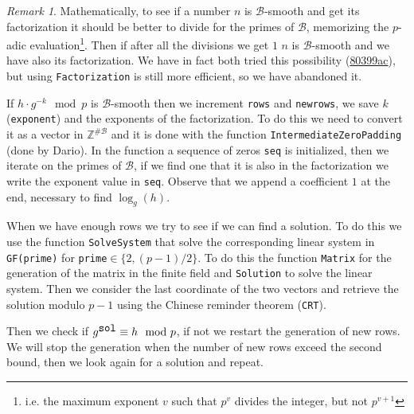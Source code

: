 \documentclass{article}
\newcommand{\ZZ}{\mathbb{Z}}
\newcommand{\BB}{\mathcal{B}}
\theoremstyle{plain}
\theoremstyle{remark}
\newtheorem{rem}{Remark}
\theoremstyle{definition}
\begin{document}
\begin{rem}
	Mathematically, to see if a number $n$ is $\mathcal{B}$-smooth and get its factorization it should be better to divide for the primes of $\BB$, memorizing the $p$-adic evaluation\footnote{i.e. the maximum exponent $v$ such that $p^v$ divides the integer, but not $p^{v+1}$}. Then if after all the divisions we get $1$ $n$ is $\BB$-smooth and we have also its factorization. 
	We have in fact both tried this possibility (\href{https://github.com/giacomoborin/project2_MAGMA/commit/80399ac928cf19e009451f174adc4138283580f2}{80399ac}), but using \texttt{Factorization} is still more efficient, so we have abandoned it. 
\end{rem}
If $h\cdot g^{-k} \mod p$ is $\BB$-smooth then we increment \texttt{rows} and \texttt{newrows}, we save $k$ (\texttt{exponent}) and the exponents of the factorization. To do this we need to convert it as a vector in $\ZZ^{\#\BB}$ and it is done with the function \texttt{IntermediateZeroPadding} (done by Dario). In the function a sequence of zeros \texttt{seq} is initialized, then we iterate on the primes of $\BB$, if we find one that it is also in the factorization we write the exponent value in \texttt{seq}. Observe that we append a coefficient $1$ at the end, necessary to find $\log_g(h)$. 

When we have enough rows we try to see if we can find a solution. To do this we use the function \texttt{SolveSystem} that solve the corresponding linear system in \texttt{GF(prime)} for \texttt{prime}$\in \{2,(p-1)/2\}$. To do this the function \texttt{Matrix} for the generation of the matrix in the finite field and \texttt{Solution} to solve the linear system. Then we consider the last coordinate of the two vectors and retrieve the solution modulo $p-1$ using the Chinese reminder theorem (\texttt{CRT}). 

Then we check if $g^{\verb|sol|} \equiv h \mod p$, if not we restart the generation of new rows. We will stop the generation when the number of new rows exceed the second bound, then we look again for a solution and repeat.
\end{document}
